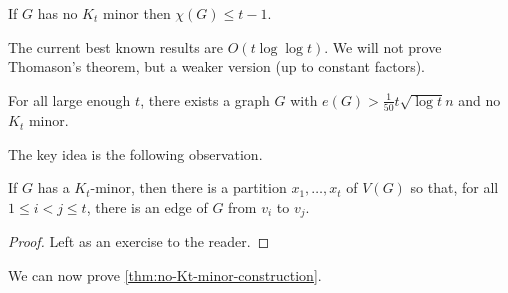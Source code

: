 \documentclass[main.tex]{subfiles}
\begin{document}
\begin{conjecture}
  If $G$ has no $K_t$ minor then $\chi(G)\leq t-1$.
\end{conjecture}
The current best known results are $O(t\log\log t)$.
We will not prove Thomason's theorem, but a weaker version (up to constant factors).
\begin{theorem}
  \th\label{thm:no-Kt-minor-construction}
  For all large enough $t$, there exists a graph $G$ with
  $e(G) > \frac{1}{50} t\sqrt{\log t}n$ and no $K_t$ minor.
\end{theorem}
The key idea is the following observation.
\begin{observation*}
  If $G$ has a $K_t$-minor, then there is a partition $x_1,\ldots,x_t$ of $V(G)$
  so that, for all $1\leq i < j\leq t$, there is an edge of $G$ from $v_i$ to $v_j$.
\end{observation*}
\begin{proof}
  Left as an exercise to the reader.
\end{proof}
We can now prove \th\ref{thm:no-Kt-minor-construction}.
\end{document}
